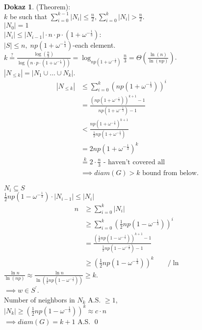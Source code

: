 \documentclass[a4paper, 12pt]{book}
\theoremstyle{definition}
\newtheorem{pro}[counter]{Dokaz}
\theoremstyle{remark}
\begin{document}
\begin{pro}(Theorem): \\
  $k$ be such that $\sum_{i=0}^{k-1} |N_i| \leq \frac{n}{2}, \sum_{i=0}^{k} |N_i| > \frac{n}{2}$. \\
  $|N_0| = 1$ \\
  $|N_i| \leq |N_{i-1}| \cdot n \cdot p \cdot (1+\omega^{-\frac{1}{3}})$: \\
  $|S| \leq n, \; np(1+\omega^{-\frac{1}{3}})$-each element. \\
  $k \stackrel{?}{=}
  \frac{\log \left(\frac{n}{3}\right)}{\log \left(n \cdot p \cdot \left(1+\omega^{-\frac{1}{3}}\right)\right)}
  = \log_{np(1+\omega^{-\frac{1}{3}})} \frac{n}{3} = \Theta\left(\frac{\ln(n)}{\ln(np)}\right)$. \\
  $|N_{\leq k}| = |N_1 \cup \dots \cup N_k|$.
  \begin{align*}
    |N_{\leq k}| &\leq \sum_{i=0}^{k} (np(1+\omega^{-\frac{1}{3}}))^i \\
    &= \frac{(np(1+\omega^{-\frac{1}{3}}))^{k+1}-1}{np(1+\omega^{-\frac{1}{3}}) - 1} \\
    &< \frac{np(1+\omega^{-\frac{1}{3}})^{k+1}}{\frac{1}{2} np(1+\omega^{-\frac{1}{3}})} \\
    &= 2 np(1+\omega^{-\frac{1}{3}})^k \\
    &\stackrel{k}{=} 2 \cdot \frac{n}{3} \text{ - haven't covered all} \\
    &\implies diam(G) > k \text{ bound from below}.
  \end{align*}



  $N_i \subseteq S$ \\
  $\frac{1}{2} n p \left(1-\omega^{-\frac{1}{3}}\right) \cdot |N_{i-1}| \leq |N_i|$ \\
  \begin{align*}
    n & \geq \sum_{i=0}^{k} |N_i| \\
    & \geq \sum_{i=0}^{k} \left(\frac{1}{2} n p \left(1-\omega^{-\frac{1}{3}}\right)\right)^i \\
    &= \frac{\left(\frac{1}{2} n p \left(1-\omega^{-\frac{1}{3}}\right)\right)^{k+1} - 1}
      {\frac{1}{2} n p \left(1-\omega^{-\frac{1}{3}}\right) - 1} \\
    &\geq \left(\frac{1}{2} n p \left(1-\omega^{-\frac{1}{3}}\right)\right)^k \qquad / \ln
  \end{align*}
  $\frac{\ln n}{\ln (np)} \approx \frac{\ln n}{\ln \left(\frac{1}{2} n p \left(1-\omega^{-\frac{1}{3}}\right)\right)} \geq k$. \\
  $\implies w \in S^{'}$. \\
  Number of neighbors in $N_k$ A.S. $\geq 1$, \\
  $|N_k| \geq \left(\frac{1}{2} n p \left(1-\omega^{-\frac{1}{3}}\right)\right)^k \approx c \cdot n$ \\
  $\implies diam (G) = k + 1 $ A.S.
  \qed
\end{pro}
\end{document}
